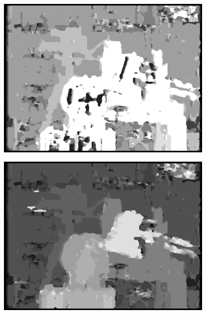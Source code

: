 \documentclass[a4paper]{scrartcl}
\begin{document}
\vspace{1cm}
\begin{minipage}{0.8\textwidth}
  \centering
  \includegraphics[width=0.8\textwidth]{disparity-r3-ssd-d8-m1.png}
  \label{fig:disparity-r3-ssd-d8-m1}
\end{minipage}

\vspace{1cm}
\begin{minipage}{0.8\textwidth}
  \centering
  \includegraphics[width=0.8\textwidth]{disparity-r3-ssd-d16-m1.png}
  \label{fig:disparity-r3-ssd-d16-m1}
\end{minipage}
\end{document}
